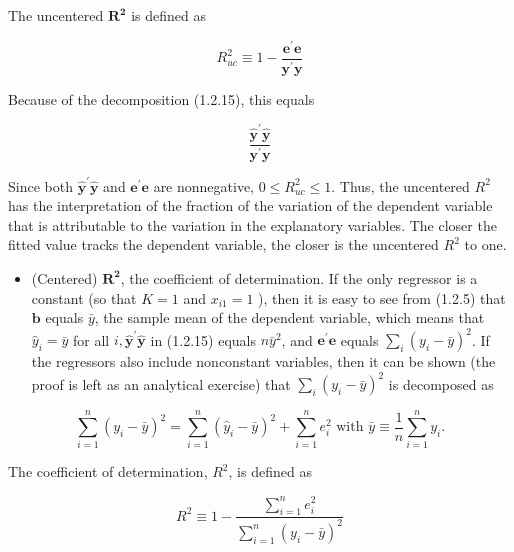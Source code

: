 \documentclass[10pt]{article}
\begin{document}
The uncentered $\boldsymbol{R}^{\mathbf{2}}$ is defined as


\begin{equation*}
R_{u c}^{2} \equiv 1-\frac{\mathbf{e}^{\prime} \mathbf{e}}{\mathbf{y}^{\prime} \mathbf{y}} \tag{1.2.16}
\end{equation*}


Because of the decomposition (1.2.15), this equals

$$
\frac{\hat{\mathbf{y}}^{\prime} \hat{\mathbf{y}}}{\mathbf{y}^{\prime} \mathbf{y}}
$$

Since both $\hat{\mathbf{y}}^{\prime} \hat{\mathbf{y}}$ and $\mathbf{e}^{\prime} \mathbf{e}$ are nonnegative, $0 \leq R_{u c}^{2} \leq 1$. Thus, the uncentered $R^{2}$ has the interpretation of the fraction of the variation of the dependent variable that is attributable to the variation in the explanatory variables. The closer the fitted value tracks the dependent variable, the closer is the uncentered $R^{2}$ to one.

\begin{itemize}
  \item (Centered) $\boldsymbol{R}^{\mathbf{2}}$, the coefficient of determination. If the only regressor is a constant (so that $K=1$ and $x_{i 1}=1$ ), then it is easy to see from (1.2.5) that $\mathbf{b}$ equals $\bar{y}$, the sample mean of the dependent variable, which means that $\hat{y}_{i}=\bar{y}$ for all $i, \hat{\mathbf{y}}^{\prime} \hat{\mathbf{y}}$ in (1.2.15) equals $n \bar{y}^{2}$, and $\mathbf{e}^{\prime} \mathbf{e}$ equals $\sum_{i}\left(y_{i}-\bar{y}\right)^{2}$. If the regressors also include nonconstant variables, then it can be shown (the proof is left as an analytical exercise) that $\sum_{i}\left(y_{i}-\bar{y}\right)^{2}$ is decomposed as
\end{itemize}


\begin{equation*}
\sum_{i=1}^{n}\left(y_{i}-\bar{y}\right)^{2}=\sum_{i=1}^{n}\left(\hat{y}_{i}-\bar{y}\right)^{2}+\sum_{i=1}^{n} e_{i}^{2} \text { with } \bar{y} \equiv \frac{1}{n} \sum_{i=1}^{n} y_{i} . \tag{1.2.17}
\end{equation*}


The coefficient of determination, $R^{2}$, is defined as


\begin{equation*}
R^{2} \equiv 1-\frac{\sum_{i=1}^{n} e_{i}^{2}}{\sum_{i=1}^{n}\left(y_{i}-\bar{y}\right)^{2}} \tag{1.2.18}
\end{equation*}
\end{document}
